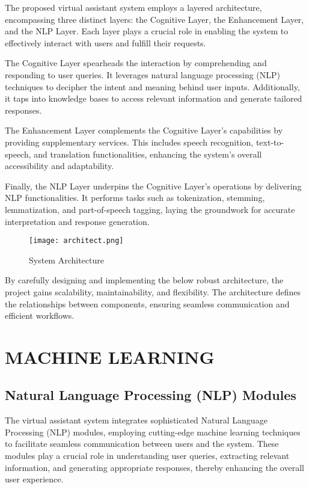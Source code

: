 \documentclass[12pt,a4paper]{report}
\begin{document}
 The proposed virtual assistant system employs a layered architecture, encompassing three distinct layers: the Cognitive Layer, the Enhancement Layer, and the NLP Layer. Each layer plays a crucial role in enabling the system to effectively interact with users and fulfill their requests.

The Cognitive Layer spearheads the interaction by comprehending and responding to user queries. It leverages natural language processing (NLP) techniques to decipher the intent and meaning behind user inputs. Additionally, it taps into knowledge bases to access relevant information and generate tailored responses.

The Enhancement Layer complements the Cognitive Layer's capabilities by providing supplementary services. This includes speech recognition, text-to-speech, and translation functionalities, enhancing the system's overall accessibility and adaptability.

Finally, the NLP Layer underpins the Cognitive Layer's operations by delivering NLP functionalities. It performs tasks such as tokenization, stemming, lemmatization, and part-of-speech tagging, laying the groundwork for accurate interpretation and response generation.

\begin{figure}[ht]
	\begin{center}
		\texttt{[image: architect.png]}
	\end{center}
	\caption{System Architecture}
\end{figure}
By carefully designing and implementing the below robust architecture, the project gains scalability, maintainability, and flexibility. The architecture defines the relationships between components, ensuring seamless communication and efficient workflows.

\newpage


\section{MACHINE LEARNING}

\subsection{Natural Language Processing (NLP) Modules}

The virtual assistant system integrates sophisticated Natural Language Processing (NLP) modules, employing cutting-edge machine learning techniques to facilitate seamless communication between users and the system. These modules play a crucial role in understanding user queries, extracting relevant information, and generating appropriate responses, thereby enhancing the overall user experience.
\end{document}
